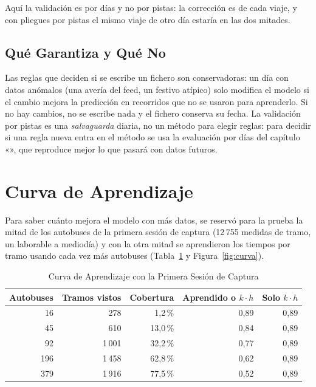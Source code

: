 \noindent Aquí la validación es por días y no por pistas: la corrección es de cada viaje, y con pliegues por pistas
el mismo viaje de otro día estaría en las dos mitades.

\subsection{Qué Garantiza y Qué No}

Las reglas que deciden si se escribe un fichero son conservadoras: un día con datos anómalos (una avería del feed, un
festivo atípico) solo modifica el modelo si el cambio mejora la predicción en recorridos que no se usaron para aprenderlo. Si no hay cambios,
no se escribe nada y el fichero conserva su fecha. La validación por pistas es una \emph{salvaguarda} diaria, no un
método para elegir reglas: para decidir si una regla nueva entra en el método se usa la evaluación por días del
capítulo «», que reproduce mejor lo que pasará con datos futuros.

\section{Curva de Aprendizaje}
\label{sec:curva}

Para saber cuánto mejora el modelo con más datos, se reservó para la prueba la mitad de los autobuses de la primera
sesión de captura (12\,755 medidas de tramo, un laborable a mediodía) y con la otra mitad se aprendieron los tiempos
por tramo usando cada vez más autobuses (Tabla~\ref{tab:curva} y Figura~\ref{fig:curva}).

\begin{table}[ht]
\centering
\caption{Curva de Aprendizaje con la Primera Sesión de Captura}\label{tab:curva}
\begin{tabular}{@{}rrrrr@{}}
\toprule
Autobuses & Tramos vistos & Cobertura & Aprendido o $k\cdot h$ & Solo $k\cdot h$\\
\midrule
16  & 278   & 1,2\,\%  & 0,89 & 0,89\\
45  & 610   & 13,0\,\% & 0,84 & 0,89\\
92  & 1\,001 & 32,2\,\% & 0,77 & 0,89\\
196 & 1\,458 & 62,8\,\% & 0,62 & 0,89\\
379 & 1\,916 & 77,5\,\% & 0,52 & 0,89\\
\bottomrule
\end{tabular}
\end{table}

